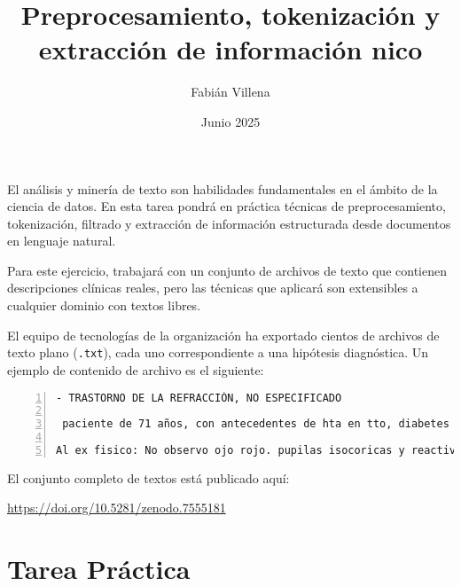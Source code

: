 \documentclass{article}
\title{Preprocesamiento, tokenización y extracción de información nico}
\author{Fabián Villena}
\date{Junio 2025}
\begin{document}
\maketitle

El análisis y minería de texto son habilidades fundamentales en el ámbito de la ciencia de datos. En esta tarea pondrá en práctica técnicas de preprocesamiento, tokenización, filtrado y extracción de información estructurada desde documentos en lenguaje natural.

Para este ejercicio, trabajará con un conjunto de archivos de texto que contienen descripciones clínicas reales, pero las técnicas que aplicará son extensibles a cualquier dominio con textos libres.

El equipo de tecnologías de la organización ha exportado cientos de archivos de texto plano (\texttt{.txt}), cada uno correspondiente a una hipótesis diagnóstica. Un ejemplo de contenido de archivo es el siguiente:

\begin{lstlisting}[breaklines=true, extendedchars=true,numbers=left,frame=single]
- TRASTORNO DE LA REFRACCIÓN, NO ESPECIFICADO

 paciente de 71 años, con antecedentes de hta en tto, diabetes insulinodependiente, dislipidemia, hipotiroidismo en tto, enfermedad renal cronica etapa iii,tabaquismo cronico importante, en febrero de este año lo suspendio. Refiere que tiene principios de Alzheimer y parkinson?????? NO SALE REGISTRO DE DIAGNOSTICOS. Refiere que necesita ic a oftalmologo. Tiene astigmatismo y miopia, ocupa lentes para ambos trastornos de viciorefraccion, refiere que hace 4 meses que ve borroso utilizando lentes ópticos.  Fue operada hace mas de 2 años por retinopatia diabetica en ambos ojos.

Al ex fisico: No observo ojo rojo. pupilas isocoricas y reactivas. no observo opacidades corneales. RFM presente. agudeza visual conservada.
\end{lstlisting}

El conjunto completo de textos está publicado aquí:

\begin{center}
  \url{https://doi.org/10.5281/zenodo.7555181}
\end{center}


\vspace{1em}
\section*{Tarea Práctica}
\end{document}
